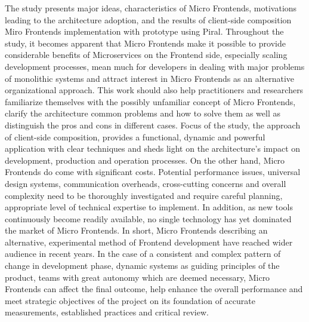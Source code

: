 \documentclass[a4paper]{book}
\begin{document}
The study presents major ideas, characteristics of Micro Frontends, motivations leading to the architecture adoption, and the results of client-side composition Miro Frontends implementation with prototype using Piral. Throughout the study, it becomes apparent that Micro Frontends make it possible to provide considerable benefits of Microservices on the Frontend side, especially scaling development processes, mean much for developers in dealing with major problems of monolithic systems and attract interest in Micro Frontends as an alternative organizational approach. This work should also help practitioners and researchers familiarize themselves with the possibly unfamiliar concept of Micro Frontends, clarify the architecture common problems and how to solve them as well as distinguish the pros and cons in different cases. Focus of the study, the approach of client-side composition, provides a functional, dynamic and powerful application with clear techniques and sheds light on the architecture's impact on development, production and operation processes. On the other hand, Micro Frontends do come with significant costs. Potential performance issues, universal design systems, communication overheads, cross-cutting concerns and overall complexity need to be thoroughly investigated and require careful planning, appropriate level of technical expertise to implement. In addition, as new tools continuously become readily available, no single technology has yet dominated the market of Micro Frontends. In short, Micro Frontends describing an alternative, experimental method of Frontend development have reached wider audience in recent years. In the case of a consistent and complex pattern of change in development phase, dynamic systems as guiding principles of the product, teams with great autonomy which are deemed necessary, Micro Frontends can affect the final outcome, help enhance the overall performance and meet strategic objectives of the project on its foundation of accurate measurements, established practices and critical review.



\end{document}
